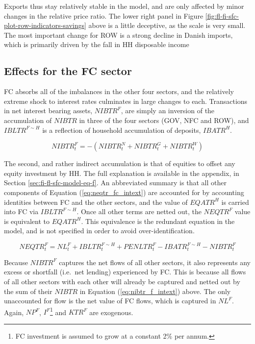 \documentclass[
]{book}
\begin{document}
Exports thus stay relatively stable in the model, and are only affected by minor changes in the relative price ratio. The lower right panel in Figure \ref{fig:fl-fi-sfc-plot-row-indicators-savings} above is a little deceptive, as the scale is very small. The most important change for ROW is a strong decline in Danish imports, which is primarily driven by the fall in HH disposable income

\hypertarget{effects-for-the-fc-sector}{%
\subsection{Effects for the FC sector}\label{effects-for-the-fc-sector}}

FC absorbs all of the imbalances in the other four sectors, and the relatively extreme shock to interest rates culminates in large changes to each. Transactions in net interest bearing assets, \(NIBTR^F\), are simply an inversion of the accumulation of \(NIBTR\) in three of the four sectors (GOV, NFC and ROW), and \(IBLTR^{F\sim H}\) is a reflection of household accumulation of deposits, \(IBATR^H\).

\begin{equation}
NIBTR^F_t = -(NIBTR^N_t + NIBTR^G_t + NIBTR^W_t )
\label{eq:nibtr_f_intext}
\end{equation}

The second, and rather indirect accumulation is that of equities to offset any equity investment by HH. The full explanation is available in the appendix, in Section \ref{sec:fi-fl-sfc-model-eq-f}. An abbreviated summary is that all other components of Equation (\ref{eq:neqtr_fc_intext}) are accounted for by accounting identities between FC and the other sectors, and the value of \(EQATR^H\) is carried into FC via \(IBLTR^{F\sim H}\). Once all other terms are netted out, the \(NEQTR^F\) value is equivalent to \(EQATR^H\). This equivalence is the redundant equation in the model, and is not specified in order to avoid over-identification.

\begin{equation}
NEQTR^F_t = NL^F_t + IBLTR^{F\sim H}_t + PENLTR^F_t - IBATR^{F\sim H}_t - NIBTR^F_t
\label{eq:neqtr_fc_intext}
\end{equation}

Because \(NIBTR^F\) captures the net flows of all other sectors, it also represents any excess or shortfall (i.e.~net lending) experienced by FC. This is because all flows of all other sectors with each other will already be captured and netted out by the sum of their \(NIBTR\) in Equation (\ref{eq:nibtr_f_intext}) above. The only unaccounted for flow is the net value of FC flows, which is captured in \(NL^F\). Again, \(NP^F\), \(I^F\)\footnote{FC investment is assumed to grow at a constant 2\% per annum.} and \(KTR^F\) are exogenous.
\end{document}
